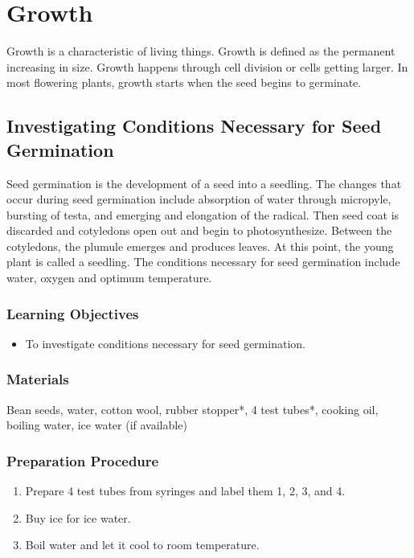 \section{Growth}
Growth is a characteristic of living things. Growth is defined as the permanent increasing in size. Growth happens through cell division or cells getting larger. In most flowering plants, growth starts when the seed begins to germinate.

\subsection{Investigating Conditions Necessary for Seed Germination}
Seed germination is the development of a seed into a seedling. The changes that occur during seed germination include absorption of water through micropyle, bursting of testa, and emerging and elongation of the radical. Then seed coat is discarded and cotyledons open out and begin to photosynthesize. Between the cotyledons, the plumule emerges and produces leaves. At this point, the young plant is called a seedling. The conditions necessary for seed germination include water, oxygen and optimum temperature.

\subsubsection*{Learning Objectives}
\begin{itemize}
\item{To investigate conditions necessary for seed germination.}
\end{itemize}

\subsubsection*{Materials}
Bean seeds, water, cotton wool, rubber stopper*, 4 test tubes*, cooking oil, boiling water, ice water (if available)

\subsubsection*{Preparation Procedure}
\begin{enumerate}
\item{Prepare 4 test tubes from syringes and label them 1, 2, 3, and 4.}
\item{Buy ice for ice water.}
\item{Boil water and let it cool to room temperature.}
\end{enumerate}

